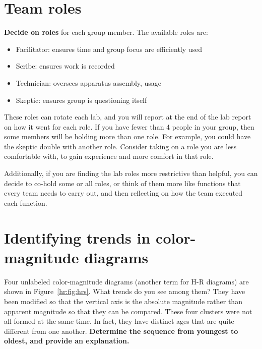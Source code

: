 
\section{Team roles}

\textbf{Decide on roles} for each group member. The available roles are:

\begin{itemize}
	\item Facilitator: ensures time and group focus are efficiently used
	\item Scribe: ensures work is recorded
	\item Technician: oversees apparatus assembly, usage
	\item Skeptic: ensures group is questioning itself
\end{itemize}

These roles can rotate each lab, and you will report at the end of the lab report on how it went for each role. If you have fewer than 4 people in your group, then some members will be holding more than one role. For example, you could have the skeptic double with another role. Consider taking on a role you are less comfortable with, to gain experience and more comfort in that role.

Additionally, if you are finding the lab roles more restrictive than helpful, you can decide to co-hold some or all roles, or think of them more like functions that every team needs to carry out, and then reflecting on how the team executed each function.

\section{Identifying trends in color-magnitude diagrams}

Four unlabeled color-magnitude diagrams (another term for H-R diagrams) are shown in Figure\ \ref{hr:fig:hrs}. What trends do you see among them? They have been modified so that the vertical axis is the absolute magnitude rather than apparent magnitude so that they can be compared. These four clusters were not all formed at the same time. In fact, they have distinct ages that are quite different from one another. \textbf{Determine the sequence from youngest to oldest, and provide an explanation.}

